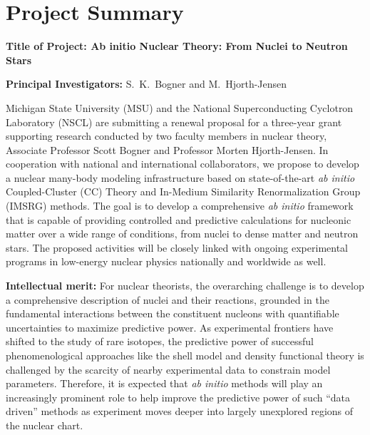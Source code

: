 \section{Project Summary}
\label{ProjectSummary}

\noindent
{\bf Title of Project: Ab initio Nuclear Theory: From Nuclei to Neutron Stars}  

\noindent
{\bf Principal Investigators:}  
S.~K.\ Bogner and M.~Hjorth-Jensen

\medskip
Michigan State University (MSU) and the National Superconducting
Cyclotron Laboratory (NSCL) are submitting a renewal proposal for a
three-year grant supporting research conducted by two faculty members
in nuclear theory, Associate Professor Scott Bogner and Professor
Morten Hjorth-Jensen. In cooperation with national and international
collaborators, we propose to develop a nuclear many-body modeling
infrastructure based on state-of-the-art \emph{ab initio}
Coupled-Cluster (CC) Theory and In-Medium Similarity Renormalization
Group (IMSRG) methods. The goal is to develop a comprehensive \emph{ab
  initio} framework that is capable of providing controlled and
predictive calculations for nucleonic matter over a wide range of
conditions, from nuclei to dense matter and neutron stars. The
proposed activities will be closely linked with ongoing experimental
programs in low-energy nuclear physics nationally and worldwide as
well.


{\bf Intellectual merit:} For nuclear theorists, the overarching
challenge is to develop a comprehensive description of nuclei and
their reactions, grounded in the fundamental interactions between the
constituent nucleons with quantifiable uncertainties to maximize
predictive power.  As experimental frontiers have shifted to the study
of rare isotopes, the predictive power of successful phenomenological
approaches like the shell model and density functional theory is
challenged by the scarcity of nearby experimental data to constrain
model parameters. Therefore, it is expected that \emph{ab initio}
methods will play an increasingly prominent role to help improve the
predictive power of such ``data driven'' methods as experiment moves
deeper into largely unexplored regions of the nuclear chart.

